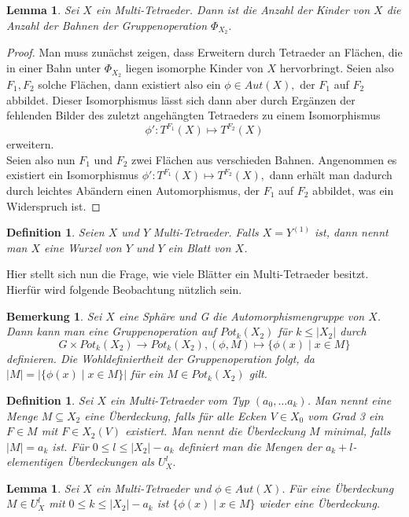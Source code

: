 \documentclass[12pt,titlepage,twoside,cleardoublepage]{article}
\theoremstyle{nummermitklammern}
\newtheorem{lemma}[temp]{Lemma}
\newtheorem{definition}[temp]{Definition}
\newtheorem{bemerkung}[temp]{Bemerkung}
\newtheorem{definition}[zahl]{Definition}
\newtheorem{lemma}[zahl]{Lemma}
\newtheorem{bemerkung}[zahl]{Bemerkung}
\numberwithin{equation}{section}
\begin{document}
\begin{lemma}
Sei $X$ ein Multi-Tetraeder. Dann ist die Anzahl der Kinder von $X$ die Anzahl der Bahnen der Gruppenoperation $\Phi_{X_2}.$
\end{lemma}
\begin{proof}
Man muss zunächst zeigen, dass Erweitern durch Tetraeder an Flächen, die in einer Bahn unter $\Phi_{X_2}$ liegen isomorphe Kinder von $X$ hervorbringt. Seien also $F_1,F_2$ solche Flächen, dann existiert also ein $\phi \in Aut(X),$ der $F_1$ auf $F_2$ abbildet. Dieser Isomorphismus lässt sich dann aber durch Ergänzen der fehlenden Bilder des zuletzt angehängten Tetraeders zu einem Isomorphismus 
\[
\phi':T^{F_1}(X)\mapsto T^{F_2}(X)
\]
 erweitern. \\
 Seien also nun $F_1$ und $F_2$ zwei Flächen aus verschieden Bahnen. Angenommen es existiert ein Isomorphismus $\phi':T^{F_1}(X)\mapsto T^{F_2}(X),$ dann erhält man dadurch durch leichtes Abändern einen Automorphismus, der $F_1$ auf $F_2$ abbildet, was ein Widerspruch ist. 
\end{proof}
\begin{definition}
Seien $X$ und $Y$ Multi-Tetraeder. Falls $X=Y^{(1)}$ ist, dann nennt man $X$ eine Wurzel von $Y$ und $Y$ ein Blatt von $X$. 
\end{definition}
Hier stellt sich nun die Frage, wie viele Blätter ein Multi-Tetraeder besitzt. Hierfür wird folgende Beobachtung nützlich sein.
\begin{bemerkung}\label{bemgruppe}
Sei $X$ eine Sphäre und G die Automorphismengruppe von $X$. Dann kann man eine Gruppenoperation auf $Pot_k(X_2)$ für $k \leq \vert X_2 \vert  $ durch 
\[
G\times Pot_k(X_2) \to Pot_k(X_2),(\phi , M)\mapsto \{\phi(x)\mid x\in M\}
\]
definieren. Die Wohldefiniertheit der Gruppenoperation folgt, da $\vert M\vert=\vert\{\phi (x)\mid x\in M\}\vert$ für ein $M\in Pot_k(X_2)$ gilt.
\end{bemerkung}
\begin{definition}
Sei $X$ ein Multi-Tetraeder vom Typ $(a_0,\ldots a_k)$. Man nennt eine Menge $M\subseteq X_2$ eine Überdeckung, falls für alle Ecken $V\in X_0$ vom Grad 3 ein $F\in M$ mit $F\in X_2(V)$ existiert. Man nennt die Überdeckung $M$ minimal, falls $\vert M\vert=a_k$ ist.
Für $0\leq l\leq \vert X_2\vert -a_k$ definiert man die Mengen der $a_k+l$-elementigen Überdeckungen als
 $U_X^l.$ 
\end{definition}
\begin{lemma}
Sei $X$ ein Multi-Tetraeder und $\phi \in Aut(X).$ Für eine Überdeckung $M\in U_X^l$ mit  $0\leq k\leq \vert X_2\vert -a_k$ ist $\{\phi(x)\mid x\in M\}$ wieder eine Überdeckung. \end{lemma}
\end{document}

